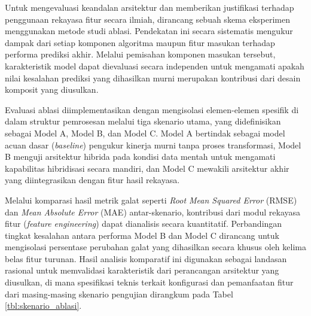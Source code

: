 Untuk mengevaluasi keandalan arsitektur dan memberikan justifikasi terhadap penggunaan rekayasa fitur secara ilmiah, dirancang sebuah skema eksperimen menggunakan metode studi ablasi. Pendekatan ini secara sistematis mengukur dampak dari setiap komponen algoritma maupun fitur masukan terhadap performa prediksi akhir. Melalui pemisahan komponen masukan tersebut, karakteristik model dapat dievaluasi secara independen untuk mengamati apakah nilai kesalahan prediksi yang dihasilkan murni merupakan kontribusi dari desain komposit yang diusulkan.

Evaluasi ablasi diimplementasikan dengan mengisolasi elemen-elemen spesifik di dalam struktur pemrosesan melalui tiga skenario utama, yang didefinisikan sebagai Model A, Model B, dan Model C. Model A bertindak sebagai model acuan dasar (\textit{baseline}) pengukur kinerja murni tanpa proses transformasi, Model B menguji arsitektur hibrida pada kondisi data mentah untuk mengamati kapabilitas hibridisasi secara mandiri, dan Model C mewakili arsitektur akhir yang diintegrasikan dengan fitur hasil rekayasa.

\newpage

Melalui komparasi hasil metrik galat seperti \textit{Root Mean Squared Error} (RMSE) dan \textit{Mean Absolute Error} (MAE) antar-skenario, kontribusi dari modul rekayasa fitur (\textit{feature engineering}) dapat dianalisis secara kuantitatif. Perbandingan tingkat kesalahan antara performa Model B dan Model C dirancang untuk mengisolasi persentase perubahan galat yang dihasilkan secara khusus oleh kelima belas fitur turunan. Hasil analisis komparatif ini digunakan sebagai landasan rasional untuk memvalidasi karakteristik dari perancangan arsitektur yang diusulkan, di mana spesifikasi teknis terkait konfigurasi dan pemanfaatan fitur dari masing-masing skenario pengujian dirangkum pada Tabel \ref{tbl:skenario_ablasi}.

